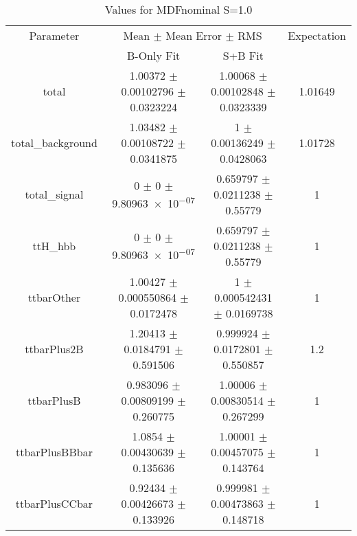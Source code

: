 \begin{table}
\centering
\caption{Values for MDFnominal S=1.0}
\begin{tabular}{cccc}
\toprule
Parameter & \multicolumn{2}{c}{Mean $\pm$ Mean Error $\pm$ RMS} & Expectation\\
 & B-Only Fit & S+B Fit & \\
\midrule
total & \num{1.00372} $\pm$ \num{0.00102796} $\pm$ \num{0.0323224} & \num{1.00068} $\pm$ \num{0.00102848} $\pm$ \num{0.0323339} & \num{1.01649}\\
total\_background & \num{1.03482} $\pm$ \num{0.00108722} $\pm$ \num{0.0341875} & \num{1} $\pm$ \num{0.00136249} $\pm$ \num{0.0428063} & \num{1.01728}\\
total\_signal & \num{0} $\pm$ \num{0} $\pm$ \num{9.80963e-07} & \num{0.659797} $\pm$ \num{0.0211238} $\pm$ \num{0.55779} & \num{1}\\
ttH\_hbb & \num{0} $\pm$ \num{0} $\pm$ \num{9.80963e-07} & \num{0.659797} $\pm$ \num{0.0211238} $\pm$ \num{0.55779} & \num{1}\\
ttbarOther & \num{1.00427} $\pm$ \num{0.000550864} $\pm$ \num{0.0172478} & \num{1} $\pm$ \num{0.000542431} $\pm$ \num{0.0169738} & \num{1}\\
ttbarPlus2B & \num{1.20413} $\pm$ \num{0.0184791} $\pm$ \num{0.591506} & \num{0.999924} $\pm$ \num{0.0172801} $\pm$ \num{0.550857} & \num{1.2}\\
ttbarPlusB & \num{0.983096} $\pm$ \num{0.00809199} $\pm$ \num{0.260775} & \num{1.00006} $\pm$ \num{0.00830514} $\pm$ \num{0.267299} & \num{1}\\
ttbarPlusBBbar & \num{1.0854} $\pm$ \num{0.00430639} $\pm$ \num{0.135636} & \num{1.00001} $\pm$ \num{0.00457075} $\pm$ \num{0.143764} & \num{1}\\
ttbarPlusCCbar & \num{0.92434} $\pm$ \num{0.00426673} $\pm$ \num{0.133926} & \num{0.999981} $\pm$ \num{0.00473863} $\pm$ \num{0.148718} & \num{1}\\
\bottomrule
\end{tabular}
\end{table}